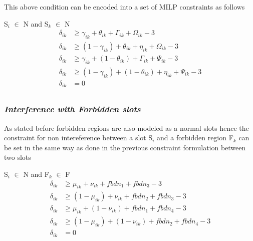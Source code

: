 This above condition can be encoded into a set of MILP constraints as follows \\
\begin{constraint} S$_i$ $\in$ N and S$_k$ $\in$ N
\begin{equation} 
\begin{split}
\delta_{ik} & \geq \gamma_{ik} + \theta_{ik} + \Gamma_{ik} + \Omega_{ik} - 3 \\
\delta_{ik} & \geq (1 - \gamma_{ik}) + \theta_{ik} + \eta_{ik} + \Omega_{ik} - 3 \\
\delta_{ik} & \geq \gamma_{ik} +(1 - \theta_{ik}) + \Gamma_{ik} + \Psi_{ik} - 3 \\
\delta_{ik} & \geq (1 - \gamma_{ik}) + (1 - \theta_{ik}) + \eta_{ik} + \Psi_{ik} - 3 \\
\delta_{ik} & = 0 \\
\end{split}
\end{equation}
\end{constraint}

\subsubsection{\textit {Interference with Forbidden slots}}

As stated before forbidden regions are also modeled as a normal slots hence the constraint for non intereference between a slot S$_i$ and a forbidden region F$_k$ can be set in the same way as done in the previous constraint formulation between two slots

\begin{constraint} S$_i$ $\in$ N and F$_k$ $\in$ F
\begin{equation}
\begin{split}
\delta_{ik} & \geq \mu_{ik} + \nu_{ik} + fbdn_1 + fbdn_3 - 3 \\
\delta_{ik} & \geq (1 - \mu_{ik}) + \nu_{ik} + fbdn_2 + fbdn_3 - 3 \\
\delta_{ik} & \geq \mu_{ik} + (1 - \nu_{ik}) + fbdn_1 + fbdn_4 - 3 \\
\delta_{ik} & \geq (1 - \mu_{ik}) + (1 - \nu_{ik}) + fbdn_2 + fbdn_4 - 3 \\
\delta_{ik} & = 0 \\
\end{split}
\end{equation}
\end{constraint}